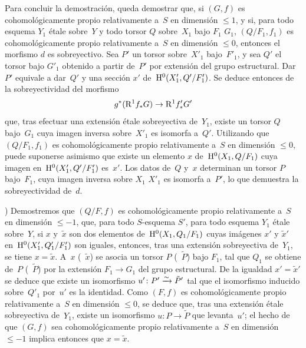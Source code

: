 Para concluir la demostración, queda demostrar que, si $(G,f)$ es
cohomológicamente propio relativamente a~$S$ en dimensión
$\leqslant 1$, y si, para todo esquema $Y_1$ étale sobre~$Y$ y todo
torsor $Q$ sobre~$X_1$ bajo
{$F_1$}
{$G_1$},
$(Q/F_1,f_1)$ es cohomológicamente propio relativamente a~$S$ en
dimensión $\leqslant 0$, entonces el morfismo $d$ es sobreyectivo. Sea
$P'$ un torsor sobre~$X'_1$ bajo~$F'_1$, y sea $Q'$ el torsor bajo
$G'_1$ obtenido a partir de~$P'$ por extensión del grupo estructural.
Dar~$P'$ equivale a dar~$Q'$ y una sección
$x'$ de~$\mathrm H^0(X'_1,Q'/F'_1)$. Se deduce entonces de la sobreyectividad
del morfismo
$$
g^*(\mathrm{R}^1 f_* G) \to \mathrm{R}^1 f'_* G'
$$
que, tras efectuar una extensión étale sobreyectiva de~$Y_1$, existe
un torsor $Q$ bajo~$G_1$ cuya imagen inversa sobre~$X'_1$ es isomorfa
a~$Q'$. Utilizando que $(Q/F_1,f_1)$ es cohomológicamente propio
relativamente a~$S$ en dimensión $\leqslant 0$, puede suponerse
asimismo que existe un elemento $x$ de~$\mathrm H^0(X_1,Q/F_1)$ cuya imagen
en~$\mathrm H^0(X'_1,Q'/F'_1)$ es~$x'$. Los datos de~$Q$ y~$x$ determinan un
torsor $P$ bajo~$F_1$, cuya imagen inversa sobre
{$X_1$}
{$X'_1$}
es isomorfa a~$P'$, lo que demuestra la sobreyectividad de~$d$.

) Demostremos que $(Q/F,f)$ es cohomológicamente propio relativamente
a~$S$ en dimensión $\leqslant -1$, \ie que, para todo $S$-esquema
$S'$, para todo esquema $Y_1$ étale sobre~$Y$, si $x$ y~$\tilde{x}$
son dos elementos de~$\mathrm H^0(X_1,Q_1/F_1)$ cuyas imágenes $x'$ y
$\tilde{x}'$ en~$\mathrm H^0(X'_1,Q'_1/F'_1)$ son iguales, entonces, tras
una extensión sobreyectiva de~$Y_1$, se tiene $x=\tilde{x}$. A~$x$
(\resp~$\tilde{x}$) se asocia un torsor $P$ (\resp~$\tilde{P}$) bajo
$F_1$, tal que $Q_1$ se obtiene de~$P$ (\resp~$\tilde{P}$) por la
extensión $F_1 \to G_1$ del grupo estructural. De la igualdad
$x'=\tilde{x}'$ se deduce que existe un isomorfismo
$u' \colon P' \xrightarrow{\sim} \tilde{P}'$ tal que el isomorfismo inducido
sobre~$Q'_1$ por~$u'$ es la identidad. Como $(F,f)$ es
cohomológicamente propio relativamente a~$S$ en dimensión
$\leqslant 0$, se deduce que,
tras una extensión étale sobreyectiva de~$Y_1$, existe un isomorfismo
$u \colon P \to \tilde{P}$ que levanta~$u'$; el hecho de que $(G,f)$
sea cohomológicamente propio relativamente a~$S$ en dimensión
$\leqslant -1$ implica entonces que $x=\tilde{x}$.

